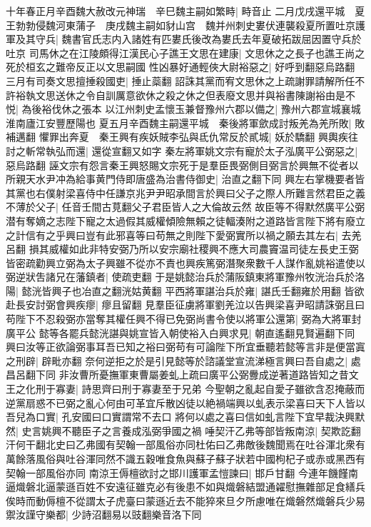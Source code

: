 十年春正月辛酉魏大赦改元神瑞　辛巳魏主嗣如繁畤|{
	畤音止}
二月戊戌還平城　夏王勃勃侵魏河東蒲子　庚戌魏主嗣如豺山宫　魏并州刺史婁伏連襲殺夏所置吐京護軍及其守兵|{
	魏書官氏志内入諸姓有匹婁氏後改為婁氏去年夏破拓跋屈因置守兵於吐京}
司馬休之在江陵頗得江漢民心子譙王文思在建康|{
	文思休之之長子也譙王尚之死於桓玄之難帝反正以文思嗣國}
性凶暴好通輕俠大尉裕惡之|{
	好呼到翻惡烏路翻}
三月有司奏文思擅捶殺國吏|{
	捶止蘂翻}
詔誅其黨而宥文思休之上疏謝罪請解所任不許裕執文思送休之令自訓厲意欲休之殺之休之但表廢文思并與裕書陳謝裕由是不悦|{
	為後裕伐休之張本}
以江州刺史孟懷玉兼督豫州六郡以備之|{
	豫州六郡宣城襄城淮南廬江安豐歷陽也}
夏五月辛酉魏主嗣還平城　秦後將軍歛成討叛羌為羌所敗|{
	敗補邁翻}
懼罪出奔夏　秦王興有疾妖賊李弘與氐仇常反於貳城|{
	妖於驕翻}
興輿疾往討之斬常執弘而還|{
	還從宣翻又如字}
秦左將軍姚文宗有寵於太子泓廣平公弼惡之|{
	惡烏路翻}
誣文宗有怨言秦王興怒賜文宗死于是羣臣畏弼側目弼言於興無不從者以所親天水尹冲為給事黄門侍即唐盛為治書侍御史|{
	治直之翻下同}
興左右掌機要者皆其黨也右僕射梁喜侍中任謙京兆尹尹昭承間言於興曰父子之際人所難言然君臣之義不薄於父子|{
	任音壬間古莧翻父子君臣皆人之大倫故云然}
故臣等不得默然廣平公弼潜有奪嫡之志陛下寵之太過假其威權傾險無賴之徒輻湊附之道路皆言陛下將有廢立之計信有之乎興曰豈有此邪喜等曰苟無之則陛下愛弼實所以禍之願去其左右|{
	去羌呂翻}
損其威權如此非特安弼乃所以安宗廟社稷興不應大司農竇温司徒左長史王弼皆密疏勸興立弼為太子興雖不從亦不責也興疾篤弼潛聚衆數千人謀作亂姚裕遣使以弼逆狀吿諸兄在藩鎮者|{
	使疏吏翻}
于是姚懿治兵於蒲阪鎮東將軍豫州牧洸治兵於洛陽|{
	懿洸皆興子也冶直之翻洸姑黄翻}
平西將軍諶治兵於雍|{
	諶氏壬翻雍於用翻}
皆欲赴長安討弼會興疾瘳|{
	瘳且留翻}
見羣臣征虜將軍劉羌泣以告興梁喜尹昭請誅弼且曰苟陛下不忍殺弼亦當奪其權任興不得已免弼尚書令使以將軍公還第|{
	弼為大將軍封廣平公}
懿等各罷兵懿洸諶與姚宣皆入朝使裕入白興求見|{
	朝直遙翻見賢遍翻下同}
興曰汝等正欲論弼事耳吾已知之裕曰弼苟有可論陛下所宜垂聽若懿等言非是便當寘之刑辟|{
	辟毗亦翻}
奈何逆拒之於是引見懿等於諮議堂宣流涕極言興曰吾自處之|{
	處昌呂翻下同}
非汝曹所憂撫軍東曹屬姜虬上疏曰廣平公弼釁成逆著道路皆知之昔文王之化刑于寡妻|{
	詩思齊曰刑于寡妻至于兄弟}
今聖朝之亂起自愛子雖欲含忍掩蔽而逆黨扇惑不已弼之亂心何由可革宜斥散凶徒以絶禍端興以虬表示梁喜曰天下人皆以吾兒為口實|{
	孔安國曰口實謂常不去口}
將何以處之喜曰信如虬言陛下宜早裁決興默然|{
	史言姚興不聽臣子之言養成泓弼爭國之禍}
唾契汗乙弗等部皆叛南涼|{
	契欺訖翻汗何干翻北史曰乙弗國有契翰一部風俗亦同杜佑曰乙弗敵後魏聞焉在吐谷渾北衆有萬餘落風俗與吐谷渾同然不識五穀唯食魚與蘇子蘇子狀若中國枸杞子或赤或黑西有契翰一部風俗亦同}
南涼王傉檀欲討之邯川護軍孟愷諫曰|{
	邯戶甘翻}
今連年饑饉南逼熾磐北逼蒙遜百姓不安遠征雖克必有後患不如與熾磐結盟通糴慰撫雜部足食繕兵俟時而動傉檀不從謂太子虎臺曰蒙遜近去不能猝來旦夕所慮唯在熾磐然熾磐兵少易禦汝謹守樂都|{
	少詩沼翻易以豉翻樂音洛下同}
